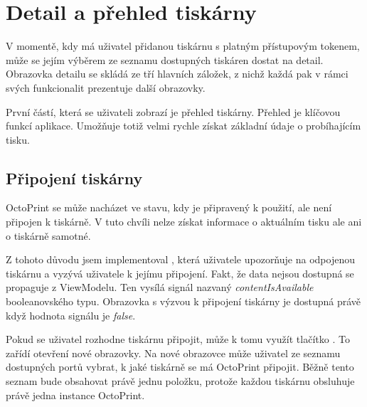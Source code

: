 \section{Detail a přehled tiskárny}

V momentě, kdy má uživatel přidanou tiskárnu s platným přístupovým tokenem, může se jejím výběrem ze seznamu dostupných tiskáren dostat na detail.
Obrazovka detailu se skládá ze tří hlavních záložek, z nichž každá pak v rámci svých funkcionalit prezentuje další obrazovky.

První částí, která se uživateli zobrazí je přehled tiskárny.
Přehled je klíčovou funkcí aplikace.
Umožňuje totiž velmi rychle získat základní údaje o probíhajícím tisku.

\subsection{Připojení tiskárny}

OctoPrint se může nacházet ve stavu, kdy je připravený k použití, ale není připojen k tiskárně.
V tuto chvíli nelze získat informace o aktuálním tisku ale ani o tiskárně samotné.

Z tohoto důvodu jsem implementoval , která uživatele upozorňuje na odpojenou tiskárnu a vyzývá uživatele k jejímu připojení.
Fakt, že data nejsou dostupná se propaguje z ViewModelu.
Ten vysílá signál nazvaný \textit{contentIsAvailable} booleanovského typu.
Obrazovka s výzvou k připojení tiskárny je dostupná právě když hodnota signálu je \textit{false}.

Pokud se uživatel rozhodne tiskárnu připojit, může k tomu využít tlačítko .
To zařídí otevření nové obrazovky.
Na nové obrazovce může uživatel ze seznamu dostupných portů vybrat, k jaké tiskárně se má OctoPrint připojit.
Běžně tento seznam bude obsahovat právě jednu položku, protože každou tiskárnu obsluhuje právě jedna instance OctoPrint.
